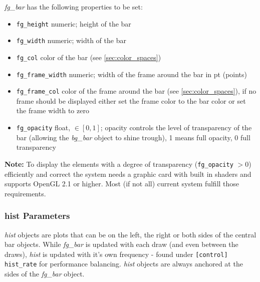 \documentclass[12pt,a4paper]{book}
\begin{document}
\textit{fg\_bar} has the following properties to be set:
\begin{itemize}
\item \verb|fg_height| numeric; height of the bar
\item \verb|fg_width| numeric; width of the bar
\item \verb|fg_col| color of the bar (see \ref{sec:color_spaces})
\item \verb|fg_frame_width| numeric; width of the frame around the bar in pt (points)
\item \verb|fg_frame_col| color of the frame around the bar  (see \ref{sec:color_spaces}), if no frame should be displayed either set the frame color to the bar color or set the frame width to zero
\item \verb|fg_opacity| float, $\in [0, 1]$; opacity controls the level of transparency of the bar (allowing the \textit{bg\_bar} object to shine trough), 1 means full opacity, 0 full transparency
\end{itemize}


\textbf{Note:} To display the elements with a degree of transparency (\verb|fg_opacity| $ > 0$) efficiently and correct the system needs a graphic card with built in shaders and supports OpenGL 2.1 or higher. Most (if not all) current system fulfill those requirements.

\subsubsection{hist Parameters}

\textit{hist} objects are plots that can be on the left, the right or both sides of the central bar objects. While \textit{fg\_bar} is updated with each draw (and even between the draws), \textit{hist} is updated with it's own frequency - found under \verb|[control] hist_rate| for performance balancing. \textit{hist} objects are always anchored at the sides of the \textit{fg\_bar} object.
\end{document}
